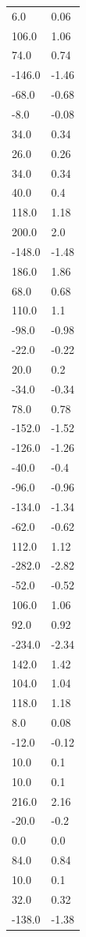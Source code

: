 \begin{longtable}{ll}
6.0 & 0.06 \\
106.0 & 1.06 \\
74.0 & 0.74 \\
-146.0 & -1.46 \\
-68.0 & -0.68 \\
-8.0 & -0.08 \\
34.0 & 0.34 \\
26.0 & 0.26 \\
34.0 & 0.34 \\
40.0 & 0.4 \\
118.0 & 1.18 \\
200.0 & 2.0 \\
-148.0 & -1.48 \\
186.0 & 1.86 \\
68.0 & 0.68 \\
110.0 & 1.1 \\
-98.0 & -0.98 \\
-22.0 & -0.22 \\
20.0 & 0.2 \\
-34.0 & -0.34 \\
78.0 & 0.78 \\
-152.0 & -1.52 \\
-126.0 & -1.26 \\
-40.0 & -0.4 \\
-96.0 & -0.96 \\
-134.0 & -1.34 \\
-62.0 & -0.62 \\
112.0 & 1.12 \\
-282.0 & -2.82 \\
-52.0 & -0.52 \\
106.0 & 1.06 \\
92.0 & 0.92 \\
-234.0 & -2.34 \\
142.0 & 1.42 \\
104.0 & 1.04 \\
118.0 & 1.18 \\
8.0 & 0.08 \\
-12.0 & -0.12 \\
10.0 & 0.1 \\
10.0 & 0.1 \\
216.0 & 2.16 \\
-20.0 & -0.2 \\
0.0 & 0.0 \\
84.0 & 0.84 \\
10.0 & 0.1 \\
32.0 & 0.32 \\
-138.0 & -1.38 \\

\end{longtable}
